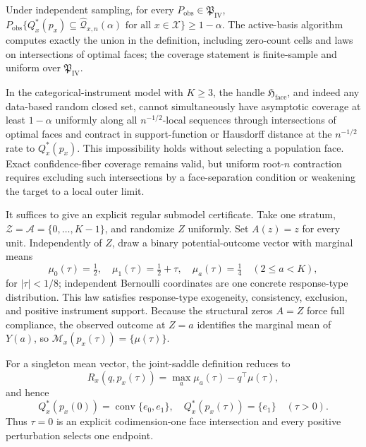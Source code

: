 Under independent sampling, for every \(P_{\mathrm{obs}}\in\mathfrak P_{\mathrm{IV}}\), \(P_{\mathrm{obs}}\{Q_x^*(p_x)\subseteq\widehat{\mathcal Q}_{x,n}(\alpha)\text{ for all }x\in\mathcal X\}\geq1-\alpha\). The active-basis algorithm computes exactly the union in the definition, including zero-count cells and laws on intersections of optimal faces; the coverage statement is finite-sample and uniform over \(\mathfrak P_{\mathrm{IV}}\).

In the categorical-instrument model with \(K\geq3\), the handle \(\mathfrak H_{\mathrm{face}}\), and indeed any data-based random closed set, cannot simultaneously have asymptotic coverage at least \(1-\alpha\) uniformly along all \(n^{-1/2}\)-local sequences through intersections of optimal faces and contract in support-function or Hausdorff distance at the \(n^{-1/2}\) rate to \(Q_x^*(p_x)\).  This impossibility holds without selecting a population face.  Exact confidence-fiber coverage remains valid, but uniform root-\(n\) contraction requires excluding such intersections by a face-separation condition or weakening the target to a local outer limit.

It suffices to give an explicit regular submodel certificate.  Take one stratum, \(\mathcal Z=\mathcal A=\{0,\ldots,K-1\}\), and randomize \(Z\) uniformly.  Set \(A(z)=z\) for every unit.  Independently of \(Z\), draw a binary potential-outcome vector with marginal means
\[
 \mu_0(\tau)=\tfrac12,\quad \mu_1(\tau)=\tfrac12+\tau,
 \quad \mu_a(\tau)=\tfrac14\quad(2\leq a<K),
\]
for \(|\tau|<1/8\); independent Bernoulli coordinates are one concrete response-type distribution.  This law satisfies response-type exogeneity, consistency, exclusion, and positive instrument support.  Because the structural zeros \(A=Z\) force full compliance, the observed outcome at \(Z=a\) identifies the marginal mean of \(Y(a)\), so \(\mathcal M_x(p_x(\tau))=\{\mu(\tau)\}\).

For a singleton mean vector, the joint-saddle definition reduces to
\[
 R_x(q,p_x(\tau))=\max_a\mu_a(\tau)-q^\top\mu(\tau),
\]
and hence
\[
 Q_x^*(p_x(0))=\operatorname{conv}\{e_0,e_1\},\quad
 Q_x^*(p_x(\tau))=\{e_1\}\quad(\tau>0).
\]
Thus \(\tau=0\) is an explicit codimension-one face intersection and every positive perturbation selects one endpoint.


